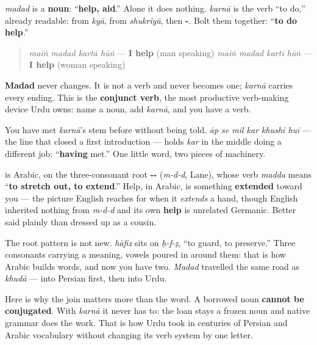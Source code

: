 \textbf{} \emph{madad} is a \textbf{noun}: “\textbf{help, aid}.” Alone it does nothing. \textbf{} \emph{karnā} is the verb “to do,” already readable: \textbf{} from \emph{kyā}, \textbf{} from \emph{shukriyā}, then \textbf{-}. Bolt them together: “\textbf{to do help}.”

\begin{grammarlens}[title={Grammar Lens: only the second half conjugates}]
\begin{quote}
\emph{maiṅ madad kartā hūṅ} — \textbf{I help} (man speaking) \emph{maiṅ madad kartī hūṅ} — \textbf{I help} (woman speaking)
\end{quote}

\textbf{Madad} never changes. It is not a verb and never becomes one; \emph{karnā} carries every ending. This is the \textbf{conjunct verb}, the most productive verb-making device Urdu owns: name a noun, add \emph{karnā}, and you have a verb.

You have met \emph{karnā}'s stem before without being told. \emph{āp se mil kar khushī huī} — the line that closed a first introduction — holds \textbf{} \emph{kar} in the middle doing a different job: “\textbf{having} met.” One little word, two pieces of machinery.
\end{grammarlens}

\begin{cousinweb}
\textbf{} is Arabic, on the three-consonant root \textbf{--} (\emph{m-d-d}, Lane), whose verb \emph{madda} means “\textbf{to stretch out, to extend}.” Help, in Arabic, is something \textbf{extended} toward you — the picture English reaches for when it \emph{extends} a hand, though English inherited nothing from \emph{m-d-d} and its own \textbf{help} is unrelated Germanic. Better said plainly than dressed up as a cousin.

The root pattern is not new. \emph{hāfiz} sits on \emph{ḥ-f-ẓ}, “to guard, to preserve.” Three consonants carrying a meaning, vowels poured in around them: that is how Arabic builds words, and now you have two. \emph{Madad} travelled the same road as \emph{khudā} — into Persian first, then into Urdu.

Here is why the join matters more than the word. A borrowed noun \textbf{cannot be conjugated}. With \emph{karnā} it never has to: the loan stays a frozen noun and native grammar does the work. That is how Urdu took in centuries of Persian and Arabic vocabulary without changing its verb system by one letter.
\end{cousinweb}

